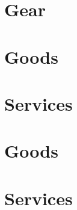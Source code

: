 \begin{multicols}{2}
    \section{Gear}

    \section{Goods}

    \section{Services}
\end{multicols}



\section{Goods}

\section{Services}
